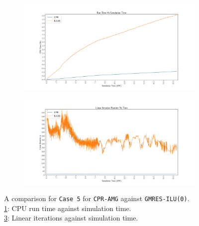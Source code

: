 \begin{figure}
\centering
\begin{subfigure}[b]{\textwidth}
   \includegraphics[width=1\linewidth]{figures/viscous/80x80/cpu_time.pdf}
   \caption{}
   \label{viscous80_cpu}
\end{subfigure}

\begin{subfigure}[b]{\textwidth}
   \includegraphics[width=1\linewidth]{figures/viscous/80x80/its_time.pdf}
   \caption{}
   \label{viscous80_its}
\end{subfigure}

\caption[caption]{A comparison for \texttt{Case 5} for \texttt{CPR-AMG} against \texttt{GMRES-ILU(0)}.\\\hspace{\textwidth}
	\cref{viscous80_cpu}: CPU run time against simulation time. \\\hspace{\textwidth}
	\cref{viscous80_its}: Linear iterations against simulation time.\\\hspace{\textwidth}}
\end{figure}

